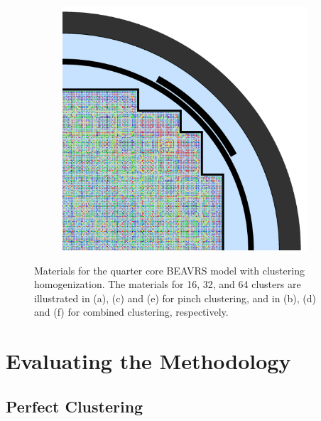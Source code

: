 \begin{figure}[h!]
\begin{subfigure}{0.48\textwidth}
  \caption{}
  \label{fig:chap10-full-core-pinch-64}
\end{subfigure}%
\begin{subfigure}{0.48\textwidth}
  \centering
  \includegraphics[width=0.9\linewidth]{figures/unsupervised/geometries/with-features/64-clusters/combined/full-core}
  \caption{}
  \label{fig:chap10-full-core-combined-64}
\end{subfigure}
\caption[Materials for BEAVRS with clustering homogenization (16 -- 64 clusters)]{Materials for the quarter core \ac{BEAVRS} model with clustering homogenization. The materials for 16, 32, and 64 clusters are illustrated in (a), (c) and (e) for pinch clustering, and in (b), (d) and (f) for combined clustering, respectively.}
\label{fig:chap10-full-core-geometries-64}
\end{figure}

\clearpage

\section{Evaluating the Methodology}
\label{sec:chap10-cluster}

\subsection{Perfect Clustering}
\label{subsec:chap10-perfect-cluster}

